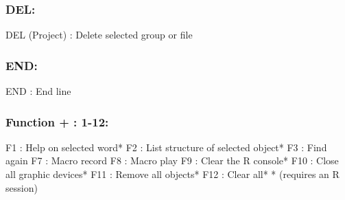 
\subsubsection{DEL:}

\vspace{-0.5cm}
\begin{Rtables}[caption={[DEL keyboard shortcut]
    DEL keyboard shortcut},
  label=shortcut:del]
  DEL (Project) : Delete selected group or file
\end{Rtables}


\subsubsection{END:}

\vspace{-0.5cm}
\begin{Rtables}[caption={[END keyboard shortcut]
    END keyboard shortcut},
  label=shortcut:end]
  END : End line
\end{Rtables}


\subsubsection{Function + : 1-12:}

\vspace{-0.5cm}
\begin{Rtables}[caption={[Function + keyboard shortcuts]
    Function + keyboard shortcuts},
  label=shortcut:funplus]
  F1  : Help on selected word*
  F2  : List structure of selected object*
  F3  : Find again
  F7  : Macro record
  F8  : Macro play
  F9  : Clear the R console*
  F10 : Close all graphic devices*
  F11 : Remove all objects*
  F12 : Clear all*
  * (requires an R session)
\end{Rtables}


